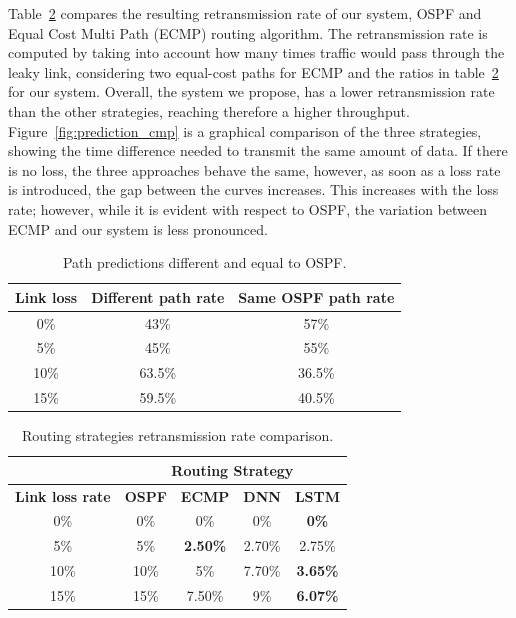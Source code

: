 Table~\ref{tab:retransmission_rate} compares the resulting retransmission rate of our system, OSPF and Equal Cost Multi Path (ECMP) routing algorithm. The retransmission rate is computed by taking into account how many times traffic would pass through the leaky link, considering two equal-cost paths for ECMP and the ratios in table~\ref{tab:retransmission_rate} for our system. Overall, the system we propose, has a lower retransmission rate than the other strategies, reaching therefore a higher throughput. Figure~\ref{fig:prediction_cmp} is a graphical comparison of the three strategies, showing the time difference needed to transmit the same amount of data. If there is no loss, the three approaches behave the same, however, as soon as a loss rate is introduced, the gap between the curves increases. This increases with the loss rate; however, while it is evident with respect to OSPF, the variation between ECMP and our system is less pronounced.

\begin{table}
\centering
{%
\begin{tabular}{|c|c|c|}
\hline
\multicolumn{1}{|l|}{\textbf{Link loss}} & \multicolumn{1}{l|}{\textbf{Different path rate}} & \multicolumn{1}{l|}{\textbf{Same OSPF path rate}} \\ \hline
0\% & 43\% & 57\% \\ \hline
5\% &45\% & 55\% \\ \hline
10\% & 63.5\% & 36.5\% \\ \hline
15\% & 59.5\% & 40.5\% \\ \hline
\end{tabular}%
}
\caption{Path predictions different and equal to OSPF.}
\label{tab:same_path_rate}
\end{table}

\begin{table}
\centering
\begin{tabular}{|c|c|c|c|c|}
\hline
\multicolumn{1}{|l|}{}  & \multicolumn{4}{c|}{\textbf{Routing Strategy}}                                          \\ \hline
\textbf{Link loss rate} & \textbf{OSPF} & \textbf{ECMP} & \textbf{DNN} &\textbf{LSTM} \\
\hline
0\% & 0\% & 0\% & 0\% & \textbf{0\%}\\
\hline
5\%  & 5\% & \textbf{2.50\%} & 2.70\%	 &2.75\%\\
\hline
10\% & 10\% & 5\% & 7.70\% & \textbf{3.65\%}\\
\hline
15\% & 15\% & 7.50\% & 9\% &\textbf{6.07\%}\\
\hline
\end{tabular}%
\caption{Routing strategies retransmission rate comparison.}
\label{tab:retransmission_rate}
\end{table}

